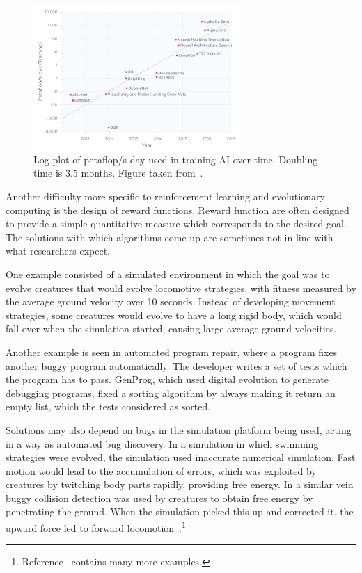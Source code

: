 \documentclass[11pt, a4paper]{report} %
\begin{document}
\begin{figure}[tb!]
  \centering
  \includegraphics[width=0.7\textwidth]{increaseaiflops.png}
  \caption{Log plot of petaflop/s-day used in training AI over time. Doubling time is 3.5 months. Figure taken from~\cite{amodei2018}.}\label{fig:increasedaiflops}
\end{figure}

Another difficulty more specific to reinforcement learning and evolutionary computing is the design of reward functions.
Reward function are often designed to provide a simple quantitative measure which corresponds to the desired goal.
The solutions with which algorithms come up are sometimes not in line with what researchers expect.

One example consisted of a simulated environment in which the goal was to evolve creatures that would evolve locomotive strategies, with fitness measured by the average ground velocity over 10 seconds.
Instead of developing movement strategies, some creatures would evolve to have a long rigid body, which would fall over when the simulation started, causing large average ground velocities.

Another example is seen in automated program repair, where a program fixes another buggy program automatically.
The developer writes a set of tests which the program has to pass.
GenProg, which used digital evolution to generate debugging programs, fixed a sorting algorithm by always making it return an empty list, which the tests considered as sorted.

Solutions may also depend on bugs in the simulation platform being used, acting in a way as automated bug discovery.
In a simulation in which swimming strategies were evolved, the simulation used inaccurate numerical simulation.
Fast motion would lead to the accumulation of errors, which was exploited by creatures by twitching body parts rapidly, providing free energy.
In a similar vein buggy collision detection was used by creatures to obtain free energy by penetrating the ground.
When the simulation picked this up and corrected it, the upward force led to forward locomotion~\cite{1803.03453}.\footnote{Reference~\cite{1803.03453} contains many more examples.} 
\end{document}
